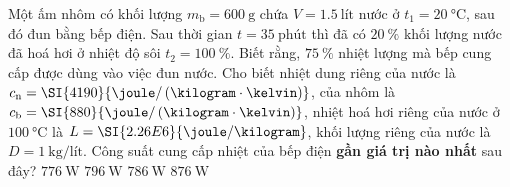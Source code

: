 \begin{ex}
Một ấm nhôm có khối lượng $m_\text{b}=\SI{600}{\gram}$ chứa $V=\SI{1.5}{\text{lít}}$ nước ở $t_1=\SI{20}{\celsius}$, sau đó đun bằng bếp điện. Sau thời gian $t=\SI{35}{\text{phút}}$ thì đã có $\SI{20}{\percent}$ khối lượng nước đã hoá hơi ở nhiệt độ sôi $t_2=\SI{100}{\percent}$. Biết rằng, $\SI{75}{\percent}$ nhiệt lượng mà bếp cung cấp được dùng vào việc đun nước. Cho biết nhiệt dung riêng của nước là $c_\text{n}=\SI{4190}{\joule/\left(\kilogram\cdot\kelvin\right)}$, của nhôm là $c_\text{b}=\SI{880}{\joule/\left(\kilogram\cdot\kelvin\right)}$, nhiệt hoá hơi riêng của nước ở $\SI{100}{\celsius}$ là $L=\SI{2.26E6}{\joule/\kilogram}$, khối lượng riêng của nước là $D=\SI{1}{\kilogram/\text{lít}}$. Công suất cung cấp nhiệt của bếp điện \textbf{gần giá trị nào nhất} sau đây?	
	\choice
	{\True $\SI{776}{\watt}$}
	{$\SI{796}{\watt}$}
	{$\SI{786}{\watt}$}
	{$\SI{876}{\watt}$}
\end{ex}
